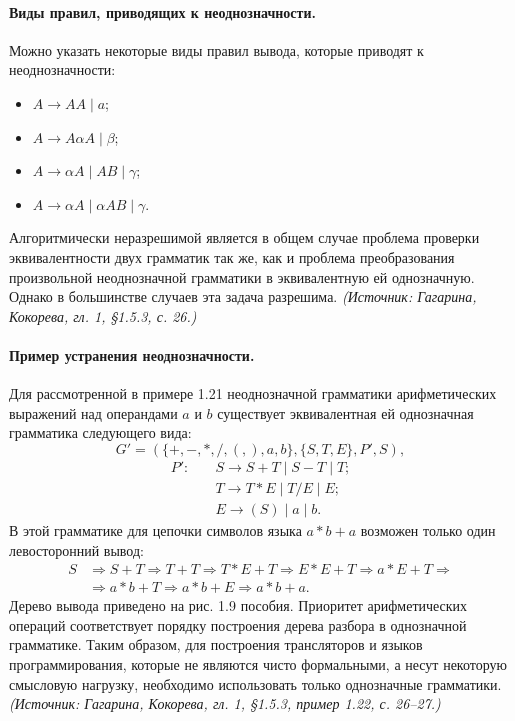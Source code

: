 \documentclass[a4paper,12pt]{article}
\begin{document}
\paragraph{Виды правил, приводящих к неоднозначности.}
Можно указать некоторые виды правил вывода, которые приводят к неоднозначности:
\begin{itemize}
\item \(A\to AA\mid a\);
\item \(A\to A\alpha A\mid\beta\);
\item \(A\to\alpha A\mid AB\mid\gamma\);
\item \(A\to\alpha A\mid\alpha AB\mid\gamma\).
\end{itemize}
Алгоритмически неразрешимой является в общем случае проблема проверки эквивалентности двух грамматик так же, как и проблема преобразования произвольной неоднозначной грамматики в эквивалентную ей однозначную. Однако в большинстве случаев эта задача разрешима.
\textit{(Источник: Гагарина, Кокорева, гл. 1, §1.5.3, с. 26.)}

\paragraph{Пример устранения неоднозначности.}
Для рассмотренной в примере 1.21 неоднозначной грамматики арифметических выражений над операндами \(a\) и \(b\) существует эквивалентная ей однозначная грамматика следующего вида:
\[
G'=(\{+,-,*,/,(,),a,b\},\{S,T,E\},P',S),
\]
\[
\begin{aligned}
P':\quad & S\to S+T\mid S-T\mid T;\\
& T\to T*E\mid T/E\mid E;\\
& E\to (S)\mid a\mid b.
\end{aligned}
\]
В этой грамматике для цепочки символов языка \(a*b+a\) возможен только один левосторонний вывод:
\[
\begin{aligned}
S&\Rightarrow S+T\Rightarrow T+T\Rightarrow T*E+T\Rightarrow E*E+T\Rightarrow a*E+T\Rightarrow\\
&\Rightarrow a*b+T\Rightarrow a*b+E\Rightarrow a*b+a.
\end{aligned}
\]
Дерево вывода приведено на рис. 1.9 пособия. Приоритет арифметических операций соответствует порядку построения дерева разбора в однозначной грамматике. Таким образом, для построения трансляторов и языков программирования, которые не являются чисто формальными, а несут некоторую смысловую нагрузку, необходимо использовать только однозначные грамматики.
\textit{(Источник: Гагарина, Кокорева, гл. 1, §1.5.3, пример 1.22, с. 26--27.)}
\end{document}
